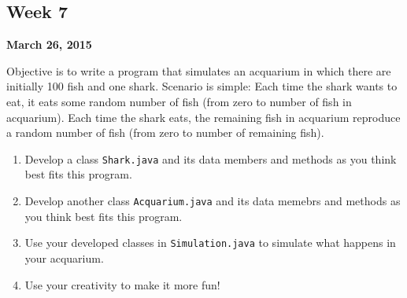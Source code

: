 \documentclass[12pt,letterpaper,twoside]{article}
\begin{document}




\subsection*{Week 7}
\hfill \textbf{March 26, 2015}

Objective is to write a program that simulates an acquarium in which there are initially 100 fish and one shark. Scenario is simple: Each time the shark wants to eat, it eats some random number of fish (from zero to number of fish in acquarium). Each time the shark eats, the remaining fish in acquarium reproduce a random number of fish (from zero to number of remaining fish).
\begin{enumerate}[itemsep=0pt]
\item Develop a class \texttt{Shark.java} and its data members and methods as you think best fits this program.
\item Develop another class \texttt{Acquarium.java} and its data memebrs and methods as you think best fits this program.
\item Use your developed classes in \texttt{Simulation.java} to simulate what happens in your acquarium.
\item Use your creativity to make it more fun!
\end{enumerate}
\end{document}
